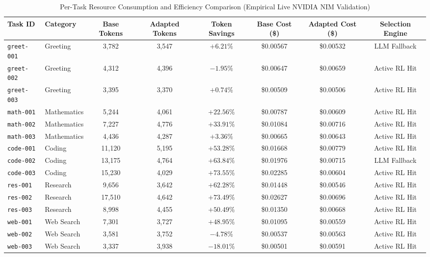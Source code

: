 \begin{table}[!t]
\centering
\caption{Per-Task Resource Consumption and Efficiency Comparison (Empirical Live NVIDIA NIM Validation)}
\label{tab:per_task_resources}
\footnotesize
\begin{tabular}{llcccccc}
\toprule
\textbf{Task ID} & \textbf{Category} & \textbf{Base Tokens} & \textbf{Adapted Tokens} & \textbf{Token Savings} & \textbf{Base Cost (\$) } & \textbf{Adapted Cost (\$) } & \textbf{Selection Engine} \\
\midrule
\texttt{greet-001} & Greeting & 3,782 & 3,547 & $+6.21\%$ & \$0.00567 & \$0.00532 & LLM Fallback \\
\texttt{greet-002} & Greeting & 4,312 & 4,396 & $-1.95\%$ & \$0.00647 & \$0.00659 & Active RL Hit \\
\texttt{greet-003} & Greeting & 3,395 & 3,370 & $+0.74\%$ & \$0.00509 & \$0.00506 & Active RL Hit \\
\texttt{math-001} & Mathematics & 5,244 & 4,061 & $+22.56\%$ & \$0.00787 & \$0.00609 & Active RL Hit \\
\texttt{math-002} & Mathematics & 7,227 & 4,776 & $+33.91\%$ & \$0.01084 & \$0.00716 & Active RL Hit \\
\texttt{math-003} & Mathematics & 4,436 & 4,287 & $+3.36\%$ & \$0.00665 & \$0.00643 & Active RL Hit \\
\texttt{code-001} & Coding & 11,120 & 5,195 & $+53.28\%$ & \$0.01668 & \$0.00779 & Active RL Hit \\
\texttt{code-002} & Coding & 13,175 & 4,764 & $+63.84\%$ & \$0.01976 & \$0.00715 & LLM Fallback \\
\texttt{code-003} & Coding & 15,230 & 4,029 & $+73.55\%$ & \$0.02285 & \$0.00604 & Active RL Hit \\
\texttt{res-001} & Research & 9,656 & 3,642 & $+62.28\%$ & \$0.01448 & \$0.00546 & Active RL Hit \\
\texttt{res-002} & Research & 17,510 & 4,642 & $+73.49\%$ & \$0.02627 & \$0.00696 & Active RL Hit \\
\texttt{res-003} & Research & 8,998 & 4,455 & $+50.49\%$ & \$0.01350 & \$0.00668 & Active RL Hit \\
\texttt{web-001} & Web Search & 7,301 & 3,727 & $+48.95\%$ & \$0.01095 & \$0.00559 & Active RL Hit \\
\texttt{web-002} & Web Search & 3,581 & 3,752 & $-4.78\%$ & \$0.00537 & \$0.00563 & Active RL Hit \\
\texttt{web-003} & Web Search & 3,337 & 3,938 & $-18.01\%$ & \$0.00501 & \$0.00591 & Active RL Hit \\

\end{tabular}
\end{table}
